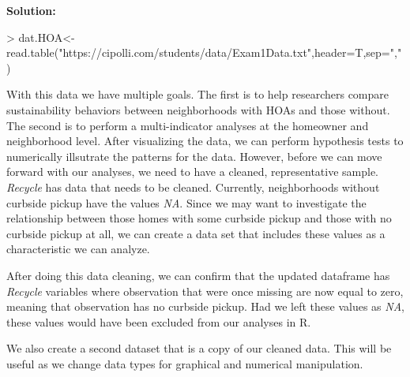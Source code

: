 \documentclass{article}
\begin{document}
\textbf{Solution:}
\begin{Schunk}
\begin{Sinput}
> dat.HOA<-read.table("https://cipolli.com/students/data/Exam1Data.txt",header=T,sep=",")
\end{Sinput}
\end{Schunk}

With this data we have multiple goals. The first is to help researchers compare sustainability behaviors between neighborhoods with HOAs and those without. The second is to perform a multi-indicator analyses at the homeowner and neighborhood level. After visualizing the data, we can perform hypothesis tests to numerically illsutrate the patterns for the data. However, before we can move forward with our analyses, we need to have a cleaned, representative sample.
\\
\textit{Recycle} has data that needs to be cleaned. Currently, neighborhoods without curbside pickup have the values \textit{NA}. Since we may want to investigate the relationship between those homes with some curbside pickup and those with no curbside pickup at all, we can create a data set that includes these values as a characteristic we can analyze. 

\begin{Schunk}
\end{Schunk}

After doing this data cleaning, we can confirm that the updated dataframe has \textit{Recycle} variables where observation that were once missing are now equal to zero, meaning that observation has no curbside pickup. Had we left these values as \textit{NA}, these values would have been excluded from our analyses in R. 


We also create a second dataset that is a copy of our cleaned data. This will be useful as we change data types for graphical and numerical manipulation. 
\end{document}
